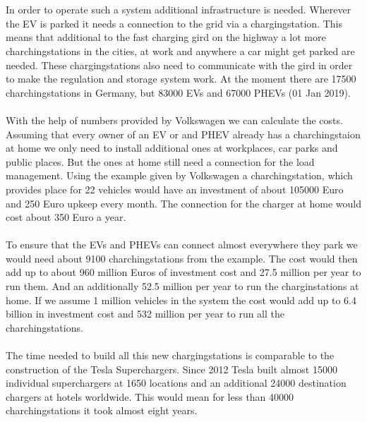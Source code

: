 \begin{parcolumns}[colwidths={1=2.5 cm, 2=10 cm, 3=2.5cm}]{3}
{\\ \\
\noindent
In order to operate such a system additional infrastructure is needed. Wherever the EV is parked it needs a connection to the grid via a chargingstation. This means that additional to the fast charging gird on the highway a lot more charchingstations in the cities, at work and anywhere a car might get parked are needed. These chargingstations also need to communicate with the gird in order to make the regulation and storage system work.
At the moment there are 17500 charchingstations in Germany, but 83000 EVs and 67000 PHEVs (01 Jan 2019).
\\ \\
With the help of numbers provided by Volkswagen we can calculate the costs. Assuming that every owner of an EV or and PHEV already has a charchingstaion at home we only need to install additional ones at workplaces, car parks and public places. But the ones at home still need a connection for the load management. Using the example given by Volkswagen a charchingstation, which provides place for 22 vehicles would have an investment of about 105000 Euro and 250 Euro upkeep every month. The connection for the charger at home would cost about 350 Euro a year.
\\ \\
To ensure that the EVs and PHEVs can connect almost everywhere they park we would need about 9100 charchingstations from the example.
The cost would then add up to about 960 million Euros of investment cost and 27.5 million per year to run them. And an additionally 52.5 million per year to run the charginstations at home.
If we assume 1 million vehicles in the system the cost would add up to 6.4 billion in investment cost and 532 million per year to run all the charchingstations.
\\ \\
\noindent
The time needed to build all this new chargingstations is comparable to the construction of the Tesla Superchargers. Since 2012 Tesla built almost 15000 individual superchargers at 1650 locations and an additional 24000 destination chargers at hotels worldwide. This would mean for less than 40000 charchingstations it took almost eight years.
}
\end{parcolumns}
